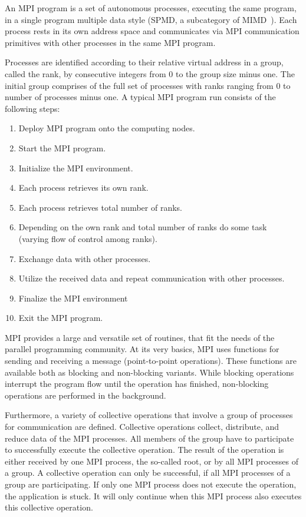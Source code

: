 An MPI program is a set of autonomous processes, executing the same
program, in a single program multiple data style (SPMD, a subcategory
of MIMD~\cite{Flynn:1972:COE:1952456.1952459}). Each process rests in
its own address space and communicates via MPI communication
primitives with other processes in the same MPI program.

Processes are identified according to their relative virtual address
in a group, called the rank, by consecutive integers from 0 to the
group size minus one. The initial group comprises of the full set of
processes with ranks ranging from 0 to number of processes minus
one. A typical MPI program run consists of the following steps:

\begin{enumerate}
\item Deploy MPI program onto the computing nodes.
\item Start the MPI program.
\item Initialize the MPI environment.
\item Each process retrieves its own rank.
\item Each process retrieves total number of ranks.
\item Depending on the own rank and total number of ranks do some
  task\\ (varying flow of control among ranks).
\item Exchange data with other processes.
\item Utilize the received data and repeat communication with other processes.
\item Finalize the MPI environment
\item Exit the MPI program.
\end{enumerate}

MPI provides a large and versatile set of routines, that fit the needs
of the parallel programming community. At its very basics, MPI uses
functions for sending and receiving a message (point-to-point
operations).  These functions are available both as blocking and
non-blocking variants. While blocking operations interrupt the program
flow until the operation has finished, non-blocking operations are
performed in the background.

Furthermore, a variety of collective operations that involve a group
of processes for communication are defined. Collective operations
collect, distribute, and reduce data of the MPI processes.  All members
of the group have to participate to successfully execute the
collective operation.  The result of the operation is either received
by one MPI process, the so-called root, or by all MPI processes of a group.  A
collective operation can only be successful, if all MPI processes of a
group are participating. If only one MPI process does not execute the
operation, the application is stuck. It will only continue when
this MPI process also executes this collective operation.


